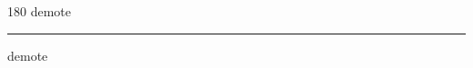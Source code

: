 
\begin{frame}
\begin{center}
\begin{turn}{180}
{\fontsize{2.5cm}{1em}\selectfont demote}
\end{turn}
\vspace{1em}\par  
\hrule
\vspace{1em}\par  
{\fontsize{2.5cm}{1em}\selectfont demote}
\end{center}
\end{frame}
